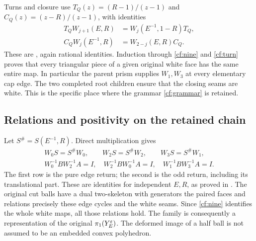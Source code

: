 Turns and closure use
$T_Q(z)=(R-1)/(z-1)$ and $C_Q(z)=(z-R)/(z-1)$, with identities
\begin{equation}\label{cf:turn}
\begin{split}
 T_QW_{j+1}(E,R)&=W_j(E^{-1},1-R)T_Q,\\
 C_QW_j(E^{-1},R)&=W_{2-j}(E,R)C_Q .
\end{split}
\end{equation}
These are \cite[equation~(5.6)]{Geometry}, again rational
identities. Induction through \eqref{cf:nine} and
\eqref{cf:turn} proves that every triangular piece of a given
original white face has the same entire map. In particular the
parent prism supplies $W_1,W_3$ at every elementary cap edge.
The two completed root children ensure that the closing seams
are white. This is the specific place where the grammar
\eqref{cf:grammar} is retained.

\subsection{Relations and positivity on the retained chain}
Let $S^\#=S(E^{-1},R)$. Direct multiplication gives
\begin{equation}\label{cf:edge-words}
\begin{gathered}
 W_0S=S^\#W_0,\qquad W_2S=S^\#W_2,\qquad W_3S=S^\#W_1,\\
 W_0^{-1}BW_2^{-1}A=I,\quad
 W_2^{-1}BW_0^{-1}A=I,\quad
 W_1^{-1}BW_3^{-1}A=I.
\end{gathered}
\end{equation}
The first row is the pure edge return; the second is the odd
return, including its translational part. These are identities
for independent $E,R$, as proved in
\cite[equations~(5.7)--(5.8)]{Geometry}.
The original cut balls have a dual two-skeleton with generators
the paired faces and relations precisely these edge cycles and
the white seams. Since \eqref{cf:nine} identifies the whole
white maps, all those relations hold. The family is consequently
a representation of the original $\pi_1(Y^\varepsilon_E)$.
The deformed image of a half ball is not assumed to be an
embedded convex polyhedron.

